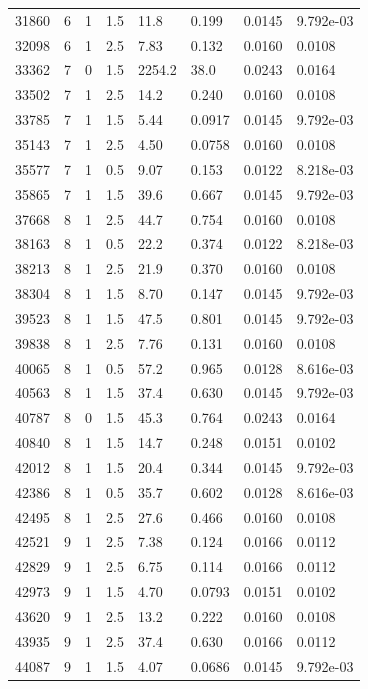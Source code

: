 \documentclass[preview]{standalone}
\begin{document}
{{{\begin{tabular}{L{1.2cm}C{1.2cm} C{0.3cm}C{0.5cm} C{1.4cm}C{1.4cm} C{1.4cm}C{1.4cm}}
  31860  &     6  & 1     & 1.5 &  11.8  & 0.199  & 0.0145 &  9.792e-03   \\ 
  32098  &     6  & 1     & 2.5 &  7.83  & 0.132  & 0.0160 &  0.0108   \\ 
  33362  &     7  & 0     & 1.5 &  2254.2  & 38.0  & 0.0243 &  0.0164   \\ 
  33502  &     7  & 1     & 2.5 &  14.2  & 0.240  & 0.0160 &  0.0108   \\ 
  33785  &     7  & 1     & 1.5 &  5.44  & 0.0917  & 0.0145 &  9.792e-03   \\ 
  35143  &     7  & 1     & 2.5 &  4.50  & 0.0758  & 0.0160 &  0.0108   \\ 
  35577  &     7  & 1     & 0.5 &  9.07  & 0.153  & 0.0122 &  8.218e-03   \\ 
  35865  &     7  & 1     & 1.5 &  39.6  & 0.667  & 0.0145 &  9.792e-03   \\ 
  37668  &     8  & 1     & 2.5 &  44.7  & 0.754  & 0.0160 &  0.0108   \\ 
  38163  &     8  & 1     & 0.5 &  22.2  & 0.374  & 0.0122 &  8.218e-03   \\ 
  38213  &     8  & 1     & 2.5 &  21.9  & 0.370  & 0.0160 &  0.0108   \\ 
  38304  &     8  & 1     & 1.5 &  8.70  & 0.147  & 0.0145 &  9.792e-03   \\ 
  39523  &     8  & 1     & 1.5 &  47.5  & 0.801  & 0.0145 &  9.792e-03   \\ 
  39838  &     8  & 1     & 2.5 &  7.76  & 0.131  & 0.0160 &  0.0108   \\ 
  40065  &     8  & 1     & 0.5 &  57.2  & 0.965  & 0.0128 &  8.616e-03   \\ 
  40563  &     8  & 1     & 1.5 &  37.4  & 0.630  & 0.0145 &  9.792e-03   \\ 
  40787  &     8  & 0     & 1.5 &  45.3  & 0.764  & 0.0243 &  0.0164   \\ 
  40840  &     8  & 1     & 1.5 &  14.7  & 0.248  & 0.0151 &  0.0102   \\ 
  42012  &     8  & 1     & 1.5 &  20.4  & 0.344  & 0.0145 &  9.792e-03   \\ 
  42386  &     8  & 1     & 0.5 &  35.7  & 0.602  & 0.0128 &  8.616e-03   \\ 
  42495  &     8  & 1     & 2.5 &  27.6  & 0.466  & 0.0160 &  0.0108   \\ 
  42521  &     9  & 1     & 2.5 &  7.38  & 0.124  & 0.0166 &  0.0112   \\ 
  42829  &     9  & 1     & 2.5 &  6.75  & 0.114  & 0.0166 &  0.0112   \\ 
  42973  &     9  & 1     & 1.5 &  4.70  & 0.0793  & 0.0151 &  0.0102   \\ 
  43620  &     9  & 1     & 2.5 &  13.2  & 0.222  & 0.0160 &  0.0108   \\ 
  43935  &     9  & 1     & 2.5 &  37.4  & 0.630  & 0.0166 &  0.0112   \\ 
  44087  &     9  & 1     & 1.5 &  4.07  & 0.0686  & 0.0145 &  9.792e-03   \\ 
\hline 
\end{tabular} 

}}}
\end{document}
